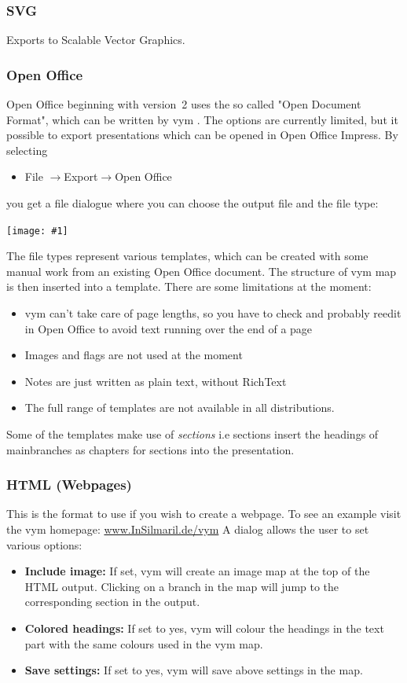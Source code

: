 \documentclass[12pt,a4paper]{article}
\newcommand{\maximage}[1]{  
    \begin{center}
        \texttt{[image: \#1]} 
    \end{center}
}
\newcommand{\vym}{{\sc vym }}
\newcommand{\ra}{$\longrightarrow$}
\begin{document}
\subsubsection{SVG}
Exports to Scalable Vector Graphics.

\subsubsection{Open Office}
Open Office beginning with version~2 uses the so called "Open Document
Format", which can be written by \vym. The options are currently
limited, but it possible to export presentations which can be opened in
Open Office Impress. By selecting
\begin{itemize}
    \item File  \ra Export\ra Open Office
\end{itemize}
you get a file dialogue where you can choose the output file and the
file type:
    \maximage{images/export-oo.png}
The file types represent various templates, which can be created with
some manual work from an existing Open Office document. The structure of
\vym map is then inserted into a template.  There are some limitations
at the moment:
\begin{itemize}
    \item \vym can't take care of page lengths, so you have to check and
    probably reedit in Open Office to avoid text running over the end of
    a page
    \item Images and flags are not used at the moment
    \item Notes are just written as plain text, without RichText 
    \item The full range of templates are not available in all
    distributions.   
\end{itemize}
Some of the templates make use of {\em sections} i.e sections insert the
headings of mainbranches as chapters for sections into the presentation.

\subsubsection{HTML (Webpages)}
This is the format to use if you wish to create a webpage. To see an example
visit the \vym homepage: 
\href{http://www.InSilmaril.de/vym}{www.InSilmaril.de/vym}
A dialog allows the user to set various options:
\begin{itemize}
    \item {\bf Include image:} If set, \vym will create an image map at
    the top of the HTML output. Clicking on a branch in the map will
    jump to the corresponding section in the output.

    \item {\bf Colored headings:}
    If set to yes, \vym will colour the headings in the text part  with the
    same colours used in the \vym map.
    \item {\bf Save settings:}
    If set to yes, \vym will save above settings in the map.
\end{itemize}
\end{document}
